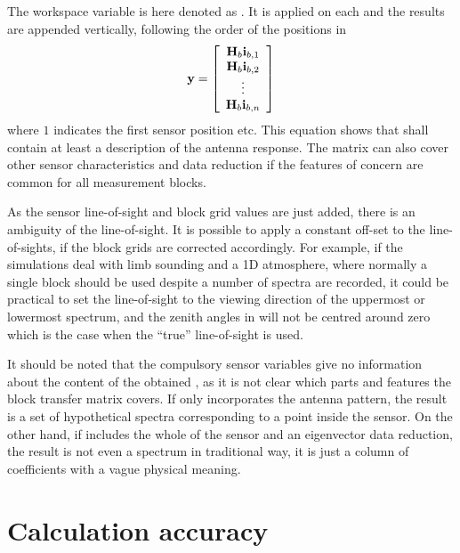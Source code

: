 The workspace variable  is here denoted as
. It is applied on each  and the results are
appended vertically, following the order of the positions in
\begin{equation}
  \mathbf{y} = \left[ \begin{array}{c} \mathbf{H}_{b}\mathbf{i}_{{b,1}} \\ 
                                    \mathbf{H}_{b}\mathbf{i}_{{b,2}} \\
                                    \vdots                     \\
                                    \mathbf{H}_{b}\mathbf{i}_{{b,n}} 
            \end{array} \right]
  \label{eq:fm_defs:measseq}
\end{equation}
where $1$ indicates the first sensor position etc. This equation shows
that  shall contain at least a description
of the antenna response. The matrix  can also cover
other sensor characteristics and data reduction if the features of
concern are common for all measurement blocks. 

As the sensor line-of-sight and block grid values are just added,
there is an ambiguity of the line-of-sight. It is possible to apply a
constant off-set to the line-of-sights, if the block grids are
corrected accordingly. For example, if the simulations deal with limb
sounding and a 1D atmosphere, where normally a single block should be
used despite a number of spectra are recorded, it could be practical
to set the line-of-sight to the viewing direction of the uppermost or
lowermost spectrum, and the zenith angles in 
will not be centred around zero which is the case when the ``true''
line-of-sight is used.

It should be noted that the compulsory sensor variables give no
information about the content of the obtained \MsrVct, as it is not
clear which parts and features the block transfer matrix covers. If
 only incorporates the antenna pattern, the result is a set
of hypothetical spectra corresponding to a point inside the sensor. On
the other hand, if  includes the whole of the sensor and an
eigenvector data reduction, the result is not even a spectrum in
traditional way, it is just a column of coefficients with a vague
physical meaning.



\section{Calculation accuracy}
\label{sec:fm_defs:accuracy}

